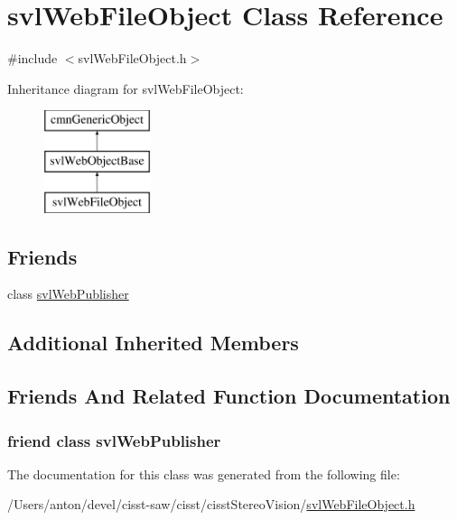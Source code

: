 \hypertarget{classsvl_web_file_object}{}\section{svl\+Web\+File\+Object Class Reference}
\label{classsvl_web_file_object}


{\ttfamily \#include $<$svl\+Web\+File\+Object.\+h$>$}

Inheritance diagram for svl\+Web\+File\+Object\+:\begin{figure}[H]
\begin{center}
\leavevmode
\includegraphics[height=3.000000cm]{d2/db0/classsvl_web_file_object}
\end{center}
\end{figure}
\subsection*{Friends}
\begin{DoxyCompactItemize}
\item 
class \hyperlink{classsvl_web_file_object_a5da5a059398f07bd737af2dae959acfa}{svl\+Web\+Publisher}
\end{DoxyCompactItemize}
\subsection*{Additional Inherited Members}


\subsection{Friends And Related Function Documentation}
\hypertarget{classsvl_web_file_object_a5da5a059398f07bd737af2dae959acfa}{}
\subsubsection[{svl\+Web\+Publisher}]{\setlength{\rightskip}{0pt plus 5cm}friend class {\bf svl\+Web\+Publisher}\hspace{0.3cm}{\ttfamily [friend]}}\label{classsvl_web_file_object_a5da5a059398f07bd737af2dae959acfa}


The documentation for this class was generated from the following file\+:\begin{DoxyCompactItemize}
\item 
/\+Users/anton/devel/cisst-\/saw/cisst/cisst\+Stereo\+Vision/\hyperlink{svl_web_file_object_8h}{svl\+Web\+File\+Object.\+h}\end{DoxyCompactItemize}
